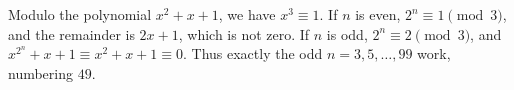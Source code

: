 Modulo the polynomial $x^2+x+1$, we have $x^3\equiv1$. If $n$ is even, $2^n\equiv1\pmod3$, and the remainder is $2x+1$, which is not zero. If $n$ is odd, $2^n\equiv2\pmod3$, and $x^{2^n}+x+1\equiv x^2+x+1\equiv0$. Thus exactly the odd $n=3,5,\ldots,99$ work, numbering $\boxed{49}$.
